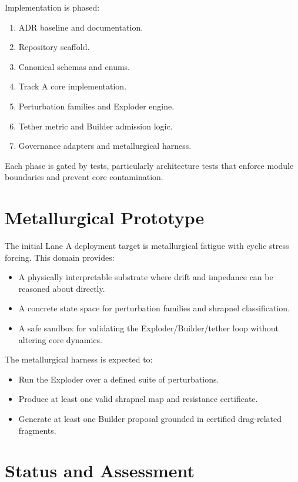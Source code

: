 \documentclass[11pt]{article}
\begin{document}
Implementation is phased:
\begin{enumerate}
  \item ADR baseline and documentation.
  \item Repository scaffold.
  \item Canonical schemas and enums.
  \item Track A core implementation.
  \item Perturbation families and Exploder engine.
  \item Tether metric and Builder admission logic.
  \item Governance adapters and metallurgical harness.
\end{enumerate}

Each phase is gated by tests, particularly architecture tests that enforce module boundaries and prevent core contamination.

\section{Metallurgical Prototype}

The initial Lane A deployment target is metallurgical fatigue with cyclic stress forcing. This domain provides:
\begin{itemize}
  \item A physically interpretable substrate where drift and impedance can be reasoned about directly.
  \item A concrete state space for perturbation families and shrapnel classification.
  \item A safe sandbox for validating the Exploder/Builder/tether loop without altering core dynamics.
\end{itemize}

The metallurgical harness is expected to:
\begin{itemize}
  \item Run the Exploder over a defined suite of perturbations.
  \item Produce at least one valid shrapnel map and resistance certificate.
  \item Generate at least one Builder proposal grounded in certified drag-related fragments.
\end{itemize}

\section{Status and Assessment}
\end{document}
